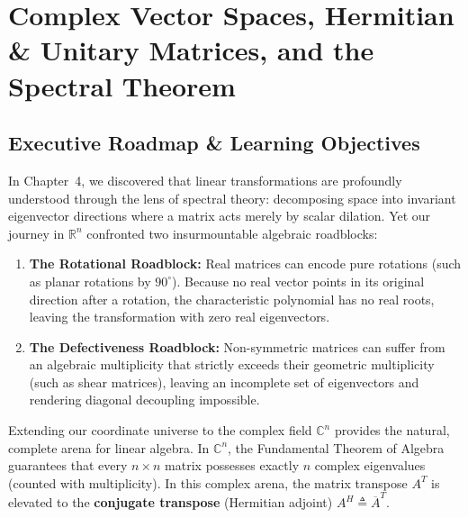 \chapter[Complex Spaces \& Spectral Theorem]{Complex Vector Spaces, Hermitian \& Unitary Matrices, and the Spectral Theorem}
\label{chap:week05}

\section{Executive Roadmap \& Learning Objectives}

In Chapter~4, we discovered that linear transformations are profoundly understood through the lens of spectral theory: decomposing space into invariant eigenvector directions where a matrix acts merely by scalar dilation. Yet our journey in $\mathbb{R}^n$ confronted two insurmountable algebraic roadblocks:
\begin{enumerate}
    \item \textbf{The Rotational Roadblock:} Real matrices can encode pure rotations (such as planar rotations by $90^\circ$). Because no real vector points in its original direction after a rotation, the characteristic polynomial has no real roots, leaving the transformation with zero real eigenvectors.
    \item \textbf{The Defectiveness Roadblock:} Non-symmetric matrices can suffer from an algebraic multiplicity that strictly exceeds their geometric multiplicity (such as shear matrices), leaving an incomplete set of eigenvectors and rendering diagonal decoupling impossible.
\end{enumerate}

Extending our coordinate universe to the complex field $\mathbb{C}^n$ provides the natural, complete arena for linear algebra. In $\mathbb{C}^n$, the Fundamental Theorem of Algebra guarantees that every $n \times n$ matrix possesses exactly $n$ complex eigenvalues (counted with multiplicity). In this complex arena, the matrix transpose $A^T$ is elevated to the \textbf{conjugate transpose} (Hermitian adjoint) $A^H \triangleq \overline{A}^T$.

